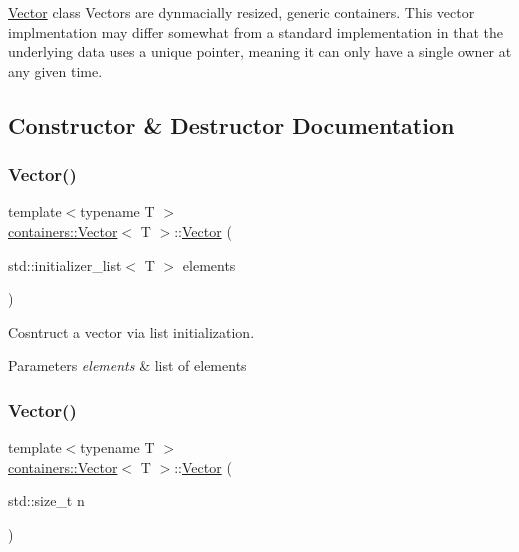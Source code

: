 \hyperlink{classcontainers_1_1_vector}{Vector} class Vectors are dynmacially resized, generic containers. This vector implmentation may differ somewhat from a standard implementation in that the underlying data uses a unique pointer, meaning it can only have a single owner at any given time. 

\subsection{Constructor \& Destructor Documentation}
\mbox{\label{classcontainers_1_1_vector_aa52463e44a833734438f930bd042950d}} 
\subsubsection{\texorpdfstring{Vector()}{Vector()}\hspace{0.1cm}{\footnotesize\ttfamily [1/5]}}
{\footnotesize\ttfamily template$<$typename T $>$ \\
\hyperlink{classcontainers_1_1_vector}{containers\+::\+Vector}$<$ T $>$\+::\hyperlink{classcontainers_1_1_vector}{Vector} (\begin{DoxyParamCaption}\item[{std\+::initializer\+\_\+list$<$ T $>$}]{elements }\end{DoxyParamCaption})\hspace{0.3cm}{\ttfamily [inline]}}

Cosntruct a vector via list initialization.


\begin{DoxyParams}{Parameters}
{\em elements} & list of elements \\
\hline
\end{DoxyParams}
\mbox{\label{classcontainers_1_1_vector_a7100579cb97bfd12a22563ecba4790c3}} 
\subsubsection{\texorpdfstring{Vector()}{Vector()}\hspace{0.1cm}{\footnotesize\ttfamily [2/5]}}
{\footnotesize\ttfamily template$<$typename T $>$ \\
\hyperlink{classcontainers_1_1_vector}{containers\+::\+Vector}$<$ T $>$\+::\hyperlink{classcontainers_1_1_vector}{Vector} (\begin{DoxyParamCaption}\item[{std\+::size\+\_\+t}]{n }\end{DoxyParamCaption})\hspace{0.3cm}{\ttfamily [inline]}}

